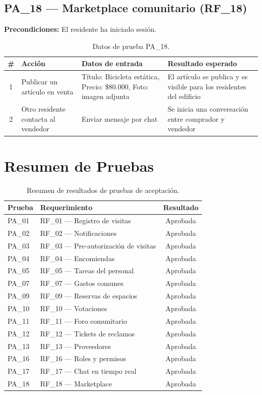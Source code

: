 \subsection{PA\_18 — Marketplace comunitario (RF\_18)}

\textbf{Precondiciones:} El residente ha iniciado sesión.

\begin{table}[H]
\centering
\small
\begin{tabular}{|c|p{}|p{}|p{}|}
\hline
\textbf{\#} & \textbf{Acción} & \textbf{Datos de entrada} & \textbf{Resultado esperado} \\ \hline
1 & Publicar un artículo en venta & Título: Bicicleta estática, Precio: \$80.000, Foto: imagen adjunta & El artículo se publica y es visible para los residentes del edificio \\ \hline
2 & Otro residente contacta al vendedor & Enviar mensaje por chat & Se inicia una conversación entre comprador y vendedor \\ \hline
\end{tabular}
\caption{Datos de prueba PA\_18.}
\end{table}

\section{Resumen de Pruebas}

\begin{table}[H]
\centering
\small
\begin{tabular}{|l|l|c|}
\hline
\textbf{Prueba} & \textbf{Requerimiento} & \textbf{Resultado} \\ \hline
PA\_01 & RF\_01 — Registro de visitas & Aprobada \\ \hline
PA\_02 & RF\_02 — Notificaciones & Aprobada \\ \hline
PA\_03 & RF\_03 — Pre-autorización de visitas & Aprobada \\ \hline
PA\_04 & RF\_04 — Encomiendas & Aprobada \\ \hline
PA\_05 & RF\_05 — Tareas del personal & Aprobada \\ \hline
PA\_07 & RF\_07 — Gastos comunes & Aprobada \\ \hline
PA\_09 & RF\_09 — Reservas de espacios & Aprobada \\ \hline
PA\_10 & RF\_10 — Votaciones & Aprobada \\ \hline
PA\_11 & RF\_11 — Foro comunitario & Aprobada \\ \hline
PA\_12 & RF\_12 — Tickets de reclamos & Aprobada \\ \hline
PA\_13 & RF\_13 — Proveedores & Aprobada \\ \hline
PA\_16 & RF\_16 — Roles y permisos & Aprobada \\ \hline
PA\_17 & RF\_17 — Chat en tiempo real & Aprobada \\ \hline
PA\_18 & RF\_18 — Marketplace & Aprobada \\ \hline
\end{tabular}
\caption{Resumen de resultados de pruebas de aceptación.}
\label{tab:resumen_pruebas}
\end{table}

